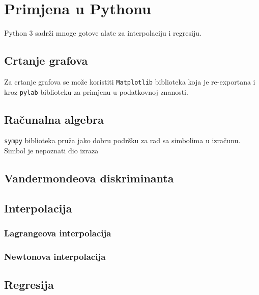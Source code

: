 \section{Primjena u Pythonu}

Python 3 sadrži mnoge gotove alate za interpolaciju i regresiju.

\subsection{Crtanje grafova}

Za crtanje grafova se može koristiti \verb|Matplotlib| biblioteka koja je
re-exportana i kroz \verb|pylab| biblioteku za primjenu u podatkovnoj znanosti.



\subsection{Računalna algebra}

\verb|sympy| biblioteka pruža jako dobru podršku za rad sa simbolima u izračunu.
Simbol je nepoznati dio izraza

\subsection{Vandermondeova diskriminanta}

\subsection{Interpolacija}

\subsubsection{Lagrangeova interpolacija}



\subsubsection{Newtonova interpolacija}


\subsection{Regresija}


